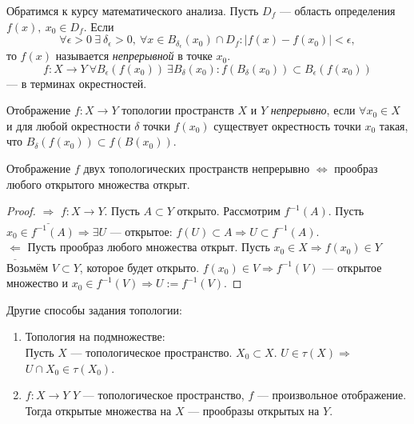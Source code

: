 \begin{definition} Обратимся к курсу математического анализа.
    Пусть $D_f$ — область определения $f(x),\ x_0\in D_f$. Если 
    \[\forall \epsilon>0\ \exists\ \delta_{\epsilon}>0,\ \forall x\in B_{\delta_{\epsilon}}(x_0)\cap D_f: |f(x)-f(x_0)|<\epsilon,\] 
    то $f(x)$ называется \textit{непрерывной} в точке $x_0$. \\
    $$f: X \to Y \ \forall B_{\epsilon}(f(x_0)) \ \exists B_{\delta}(x_0): f(B_{\delta}(x_0)) \subset B_{\epsilon}(f(x_0))$$ — в терминах окрестностей.
\end{definition}



\begin{definition}
    Отображение $f: X \to Y$ топологии пространств $X$ и $Y$ \textit{непрерывно}, если $\forall x_0 \in X$ и для любой окрестности $\delta$ точки $f(x_0)$ существует окрестность точки $x_0$ такая, что $B_{\delta} (f(x_0)) \subset f(B(x_0))$.
\end{definition}

\begin{statement}
    Отображение $f$ двух топологических пространств непрерывно $\Leftrightarrow$ прообраз любого открытого множества открыт.
\end{statement}
\begin{proof}
    $\underline{\Longrightarrow}$ $f: X \to Y$. Пусть $A \subset Y$ открыто. Рассмотрим $f^{-1}(A)$. Пусть $x_0 \in f^{-1}(A) \Rightarrow \exists U$ — открытое: $f(U) \subset A \Rightarrow U \subset f^{-1}(A)$. \\
    $\underline{\Longleftarrow}$ Пусть прообраз любого множества открыт. Пусть $x_0 \in X \Rightarrow f(x_0) \in Y$ Возьмём $V \subset Y$, которое будет открыто. $f(x_0) \in V \Rightarrow f^{-1}(V)$ — открытое множество и $x_0 \in f^{-1}(V) \Rightarrow U := f^{-1}(V)$.
\end{proof}

Другие способы задания топологии:
\begin{enumerate}
    \item Топология на подмножестве: \\
    Пусть $X$ — топологическое пространство. $X_0 \subset X$. $U \in \tau(X) \Rightarrow$ $U \cap X_0 \in \tau(X_0)$.
    \item $f: X \to Y$ $Y$ — топологическое пространство, $f$ — произвольное отображение. Тогда открытые множества на $X$ — прообразы открытых на $Y$.
\end{enumerate}

